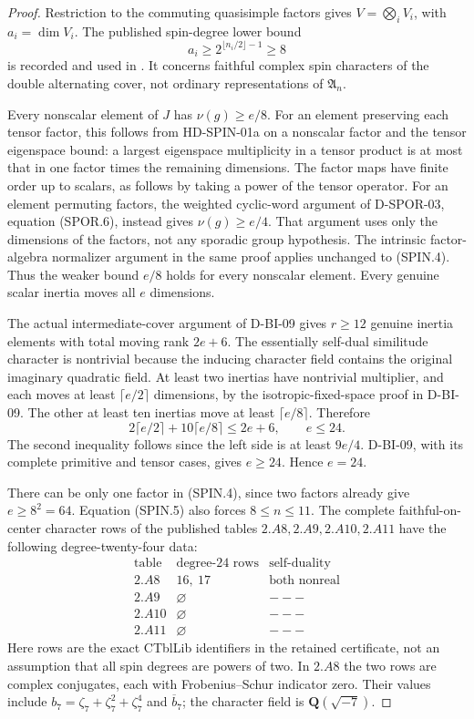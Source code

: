 \begin{proof}
Restriction to the commuting quasisimple factors gives
$V=\bigotimes_i V_i$, with $a_i=\dim V_i$.  The published
spin-degree lower bound
\[
                   a_i\ge2^{\lfloor n_i/2\rfloor-1}\ge8  \tag{SPIN.5}
\]
is recorded and used in
\cite[proof of Proposition~3.4, p.~626]{HD:GT2012}.
It concerns faithful complex spin characters of the double
alternating cover, not ordinary representations of $\mathfrak A_n$.

Every nonscalar element of $J$ has $\nu(g)\ge e/8$.
For an element preserving each tensor factor, this follows from
HD-SPIN-01a on a nonscalar factor and the tensor eigenspace bound:
a largest eigenspace multiplicity in a tensor product is at most
that in one factor times the remaining dimensions.  The factor
maps have finite order up to scalars, as follows by taking a power
of the tensor operator.
For an element permuting factors, the weighted cyclic-word
argument of D-SPOR-03, equation (SPOR.6), instead gives
$\nu(g)\ge e/4$.  That argument uses only the dimensions of
the factors, not any sporadic group hypothesis.  The intrinsic
factor-algebra normalizer argument in the same proof applies
unchanged to (SPIN.4).  Thus the weaker bound $e/8$ holds for
every nonscalar element.  Every genuine scalar inertia moves all
$e$ dimensions.

The actual intermediate-cover argument of D-BI-09 gives
$r\ge12$ genuine inertia elements with total moving rank
$2e+6$.  The essentially self-dual similitude character is
nontrivial because the inducing character field contains the
original imaginary quadratic field.  At least two inertias have
nontrivial multiplier, and each moves at least $\lceil e/2\rceil$
dimensions, by the isotropic-fixed-space proof in D-BI-09.
The other at least ten inertias move at least $\lceil e/8\rceil$.
Therefore
\[
       2\lceil e/2\rceil+10\lceil e/8\rceil\le2e+6,
       \qquad e\le24.                                   \tag{SPIN.6}
\]
The second inequality follows since the left side is at least
$9e/4$.  D-BI-09, with its complete primitive and tensor cases,
gives $e\ge24$.  Hence $e=24$.

There can be only one factor in (SPIN.4), since two factors
already give $e\ge8^2=64$.  Equation (SPIN.5) also forces
$8\le n\le11$.  The complete faithful-on-center character rows
of the published tables $2.A8,2.A9,2.A10,2.A11$ have the
following degree-twenty-four data:
\[
\begin{array}{c|c|c}
\text{table}&\text{degree-24 rows}&\text{self-duality}\\ \hline
2.A8&16,\ 17&\text{both nonreal}\\
2.A9&\varnothing&---\\
2.A10&\varnothing&---\\
2.A11&\varnothing&---
\end{array}                                             \tag{SPIN.7}
\]
Here rows are the exact CTblLib identifiers in the retained
certificate, not an assumption that all spin degrees are powers
of two.  In $2.A8$ the two rows are complex conjugates, each
with Frobenius--Schur indicator zero.  Their values include
$b_7=\zeta_7+\zeta_7^2+\zeta_7^4$ and $\overline b_7$;
the character field is $\mathbf Q(\sqrt{-7})$.


\end{proof}
